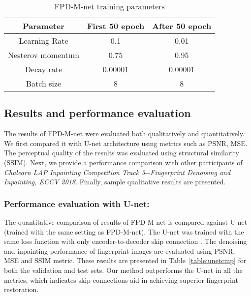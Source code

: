 \documentclass{llncs}
\begin{document}
\begin{table}[h!]
\centering
\addtolength{\tabcolsep}{10pt}
\begin{tabular}{ c | c | c}
    \hline \hline
    Parameter         & First 50 epoch & After 50 epoch \\ [0.5ex] \hline \hline
    Learning Rate     & 0.1            & 0.01           \\ 
    Nesterov momentum & 0.75           & 0.95           \\ 
    Decay rate        & 0.00001        & 0.00001        \\ 
    Batch size        & 8              & 8              \\ [0.3ex] \hline \hline
\end{tabular}
\caption{FPD-M-net training parameters}
\label{table:parameter}
\end{table}
\vspace{-1.3cm}

\subsection{Results and performance evaluation}
\label{ssec:results}
\vspace{-0.1cm}
The results of FPD-M-net were evaluated both qualitatively and quantitatively. We first compared it with U-net architecture using metrics such as PSNR, MSE. The perceptual quality of the results was evaluated using structural similarity (SSIM). Next, we provide a performance comparison with other participants of \textit{Chalearn LAP Inpainting Competition Track 3$ - $Fingerprint Denoising and Inpainting, ECCV 2018}. Finally, sample qualitative results are presented.

\subsubsection{Performance evaluation with U-net:}
\label{sssec:unet}
The quantitative comparison of results of FPD-M-net is compared against U-net (trained with the same setting as FPD-M-net). The U-net was trained with the same loss function with only encoder-to-decoder skip connection \cite{ronneberger2015u}. The denoising and inpainting performance of fingerprint images are evaluated using PSNR, MSE and SSIM metric. These results are presented in Table~\ref{table:unetcmp} for both the validation and test sets. Our method outperforms the U-net in all the metrics, which indicates skip connections aid in achieving superior fingerprint restoration.
\end{document}
